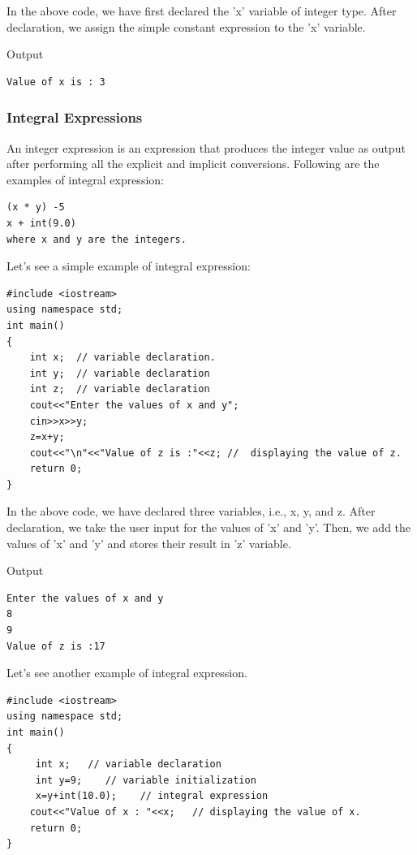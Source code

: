\documentclass{book}
\begin{document}
In the above code, we have first declared the 'x' variable of integer type. After declaration, we assign the simple constant expression to the 'x' variable.

Output

\begin{Verbatim}
Value of x is : 3  
\end{Verbatim} 

\subsubsection{Integral Expressions}

An integer expression is an expression that produces the integer value as output after performing all the explicit and implicit conversions. Following are the examples of integral expression:

\begin{lstlisting}
(x * y) -5        
x + int(9.0)  
where x and y are the integers.  
\end{lstlisting}

Let's see a simple example of integral expression:

\begin{lstlisting}
#include <iostream>  
using namespace std;  
int main()  
{  
	int x;  // variable declaration.  
	int y;  // variable declaration  
	int z;  // variable declaration  
	cout<<"Enter the values of x and y";  
	cin>>x>>y;  
	z=x+y;  
	cout<<"\n"<<"Value of z is :"<<z; //  displaying the value of z.  
	return 0;  
}  
\end{lstlisting}

In the above code, we have declared three variables, i.e., x, y, and z. After declaration, we take the user input for the values of 'x' and 'y'. Then, we add the values of 'x' and 'y' and stores their result in 'z' variable.

Output

\begin{Verbatim}
Enter the values of x and y
8
9 
Value of z is :17     
\end{Verbatim}

Let's see another example of integral expression.

\begin{lstlisting}
#include <iostream>  
using namespace std;  
int main()  
{  
	 int x;   // variable declaration  
	 int y=9;    // variable initialization  
	 x=y+int(10.0);    // integral expression  
	cout<<"Value of x : "<<x;   // displaying the value of x.  
	return 0;  
}  
\end{lstlisting}
\end{document}
